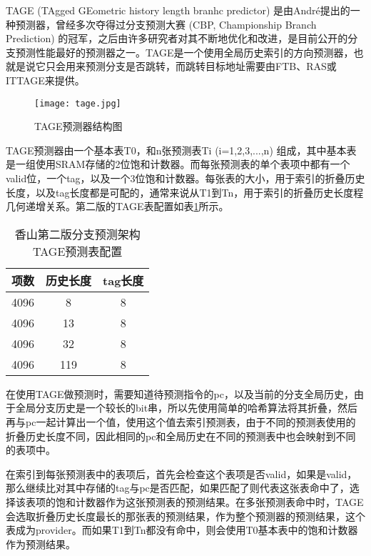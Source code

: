 TAGE (TAgged GEometric history length branhc predictor) 是由André提出的一种预测器\cite{tage}，曾经多次夺得过分支预测大赛 (CBP, Championship Branch Prediction) 的冠军，之后由许多研究者对其不断地优化和改进，是目前公开的分支预测性能最好的预测器之一。TAGE是一个使用全局历史索引的方向预测器，也就是说它只会用来预测分支是否跳转，而跳转目标地址需要由FTB、RAS或ITTAGE来提供。


\begin{figure}[htb]
	\centering
	\setlength\tabcolsep{3pt}  %
	\vspace{5pt} %
	\texttt{[image: tage.jpg]}
	\caption{TAGE预测器结构图\cite{tage}}
	\label{fig:figure23}
\end{figure}

TAGE预测器由一个基本表T0，和n张预测表Ti (i=1,2,3,...,n) 组成，其中基本表是一组使用SRAM存储的2位饱和计数器。而每张预测表的单个表项中都有一个valid位，一个tag，以及一个3位饱和计数器。每张表的大小，用于索引的折叠历史长度，以及tag长度都是可配的，通常来说从T1到Tn，用于索引的折叠历史长度程几何递增关系。第二版的TAGE表配置如表\ref{tb:table21}所示。

\begin{table}[]
	\caption{香山第二版分支预测架构TAGE预测表配置}
	\label{tb:table21}
	\centering
	\begin{tabular}{|c|c|c|}
		\hline
		项数   & 历史长度   & tag长度   \\ \hline
		4096 & 8 & 8 \\ \hline
		4096 & 13 & 8 \\ \hline
		4096 & 32 & 8 \\ \hline
		4096 & 119 & 8 \\ \hline
	\end{tabular}
\end{table}

在使用TAGE做预测时，需要知道待预测指令的pc，以及当前的分支全局历史，由于全局分支历史是一个较长的bit串，所以先使用简单的哈希算法将其折叠，然后再与pc一起计算出一个值，使用这个值去索引预测表，由于不同的预测表使用的折叠历史长度不同，因此相同的pc和全局历史在不同的预测表中也会映射到不同的表项中。

在索引到每张预测表中的表项后，首先会检查这个表项是否valid，如果是valid，那么继续比对其中存储的tag与pc是否匹配，如果匹配了则代表这张表命中了，选择该表项的饱和计数器作为这张预测表的预测结果。在多张预测表命中时，TAGE会选取折叠历史长度最长的那张表的预测结果，作为整个预测器的预测结果，这个表成为provider。而如果T1到Tn都没有命中，则会使用T0基本表中的饱和计数器作为预测结果。

